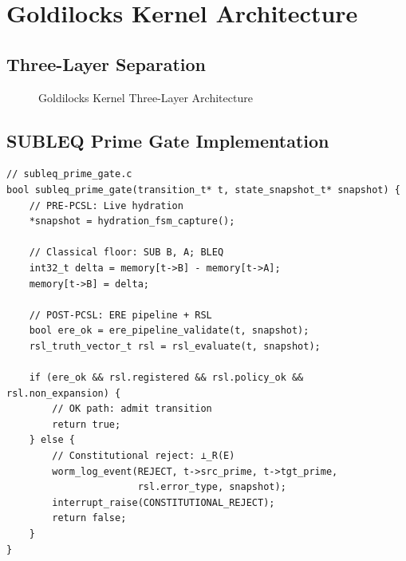 \documentclass[11pt,a4paper]{article}
\begin{document}
\section{Goldilocks Kernel Architecture}

\subsection{Three-Layer Separation}

\begin{figure}[h]
\centering
{}
\caption{Goldilocks Kernel Three-Layer Architecture}
\label{fig:kernel_arch}
\end{figure}

\subsection{SUBLEQ Prime Gate Implementation}

\begin{lstlisting}[caption={SUBLEQ Prime Gate with PCSL}, label=lst:subleq]
// subleq_prime_gate.c
bool subleq_prime_gate(transition_t* t, state_snapshot_t* snapshot) {
    // PRE-PCSL: Live hydration
    *snapshot = hydration_fsm_capture();
    
    // Classical floor: SUB B, A; BLEQ
    int32_t delta = memory[t->B] - memory[t->A];
    memory[t->B] = delta;
    
    // POST-PCSL: ERE pipeline + RSL
    bool ere_ok = ere_pipeline_validate(t, snapshot);
    rsl_truth_vector_t rsl = rsl_evaluate(t, snapshot);
    
    if (ere_ok && rsl.registered && rsl.policy_ok && rsl.non_expansion) {
        // OK path: admit transition
        return true;
    } else {
        // Constitutional reject: ⊥_R(E)
        worm_log_event(REJECT, t->src_prime, t->tgt_prime, 
                       rsl.error_type, snapshot);
        interrupt_raise(CONSTITUTIONAL_REJECT);
        return false;
    }
}
\end{lstlisting}
\end{document}
